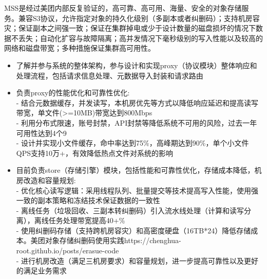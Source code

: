 \documentclass{resume}
\begin{document}
MSS是经过美团内部反复验证的，高可靠、高可用、海量、安全的对象存储服务。兼容S3协议，允许指定对象的持久化级别（多副本或者纠删码）；支持机房容灾；保证副本之间强一致；保证在集群掉电或少于设计数量的磁盘损坏的情况下数据不丢失；自动化扩容与故障隔离；高并发情况下毫秒级别的写入性能以及较高的网络和磁盘带宽；多种措施保证集群高可用性。
\begin{itemize}
  \item 了解并参与系统的整体架构，参与设计和实现proxy（协议模块）整体响应和处理流程，包括请求信息处理、元数据导入封装和请求路由
\end{itemize}
\begin{itemize}
  \item 负责proxy的性能优化和可靠性优化:\\
  - 结合元数据缓存，并发读写，本机房优先等方式以降低响应延迟和提高读写带宽，单文件(>=10MB)带宽达到800Mbps\\
  - 利用分布式限速，账号封禁，API封禁等降低系统不可用的风险，过去一年可用性达到4个9\\
  - 设计并实现小文件缓存，命中率达到75\%，高峰期达到90\%，单个小文件QPS支持10万+，有效降低热点文件对系统的影响
\end{itemize}
\begin{itemize}
  \item 目前负责store（存储引擎）模块，包括性能和可靠性优化，存储成本降低，机房改造和容量规划:\\
  - 优化核心读写逻辑：采用线程队列、批量提交等技术提高写入性能，使用强一致的副本策略和冻结技术保证数据的一致性\\
  - 离线任务（垃圾回收、三副本转纠删码）引入流水线处理（计算和读写分离），离线任务处理带宽提高40+\%\\
  - 使用纠删码存储（支持跨机房容灾）和高密度硬盘（16TB*24）降低存储成本。美团对象存储纠删码使用实践https://chenghua-root.github.io/posts/erasue-code\\
  - 进行机房改造（满足三机房要求）和容量规划，进一步提高可靠性以及更好的满足业务需求
\end{itemize}

\end{document}
